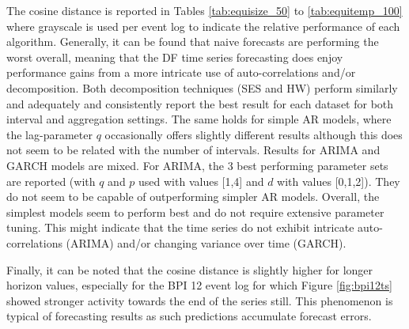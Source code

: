 The cosine distance is reported in Tables \ref{tab:equisize_50} to \ref{tab:equitemp_100} where grayscale is used per event log to indicate the relative performance of each algorithm.
Generally, it can be found that naive forecasts are performing the worst overall, meaning that the DF time series forecasting does enjoy performance gains from a more intricate use of auto-correlations and/or decomposition.
Both decomposition techniques (SES and HW) perform similarly and adequately and consistently report the best result for each dataset for both interval and aggregation settings.
The same holds for simple AR models, where the lag-parameter $q$ occasionally offers slightly different results although this does not seem to be related with the number of intervals.
Results for ARIMA and GARCH models are mixed.
For ARIMA, the 3 best performing parameter sets are reported (with $q$ and $p$ used with values [1,4] and $d$ with values [0,1,2]).
They do not seem to be capable of outperforming simpler AR models.
Overall, the simplest models seem to perform best and do not require extensive parameter tuning.
This might indicate that the time series do not exhibit intricate auto-correlations (ARIMA) and/or changing variance over time (GARCH). 

Finally, it can be noted that the cosine distance is slightly higher for longer horizon values, especially for the BPI 12 event log for which Figure \ref{fig:bpi12ts} showed stronger activity towards the end of the series still.
This phenomenon is typical of forecasting results as such predictions accumulate forecast errors.




